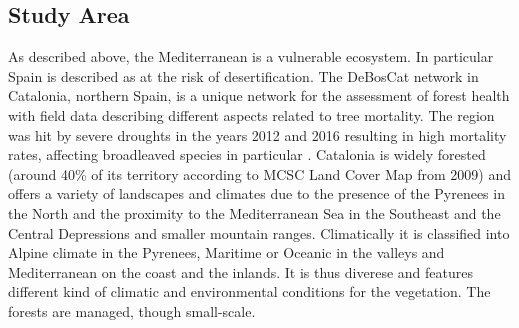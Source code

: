\subsection{Study Area}\label{subsec:studarea}
As described above, the Mediterranean is a vulnerable ecosystem. In particular Spain is described as at the risk of desertification. The DeBosCat network in Catalonia, northern Spain, is a unique network for the assessment of forest health with field data describing different aspects related to tree mortality. The region was hit by severe droughts in the years 2012 and 2016 resulting in high mortality rates, affecting broadleaved species in particular \citep{chaparro2017}. Catalonia is widely forested (around 40\% of its territory according to MCSC Land Cover Map from 2009) and offers a variety of landscapes and climates due to the presence of the Pyrenees in the North and the proximity to the Mediterranean Sea in the Southeast and the Central Depressions and smaller mountain ranges. Climatically it is classified into Alpine climate in the Pyrenees, Maritime or Oceanic in the valleys and Mediterranean on the coast and the inlands. It is thus diverese and features different kind of climatic and environmental conditions for the vegetation. The forests are managed, though small-scale.\\


